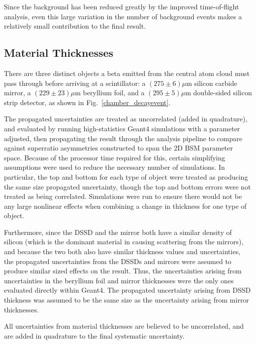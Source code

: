 Since the background has been reduced greatly by the improved time-of-flight
analysis, even this large variation in the number of background events makes a relatively small contribution to the final result.


\subsection{Material Thicknesses}
There are three distinct objects a beta emitted from the central atom cloud must pass through before arriving at a scintillator:  a $(275 \pm 6) \mu$m silicon carbide mirror, a $(229 \pm 23) \mu$m beryllium foil, and a $(295 \pm 5) \mu$m double-sided silicon strip detector, as shown in Fig.~\ref{chamber_decayevent}.~

The propagated uncertainties are treated as uncorrelated (added in quadrature), and evaluated by running high-statistics Geant4 simulations with a parameter adjusted, then propagating the result through the analysis pipeline to compare against superratio asymmetries constructed to span the 2D BSM parameter space.  Because of the processor time required for this, certain simplifying assumptions were used to reduce the necessary number of simulations.  In particular, the top and bottom for each type of object were treated as producing the same size propagated uncertainty, though the top and bottom errors were not treated as being correlated.  Simulations were run to ensure there would not be any large nonlinear effects when combining a change in thickness for one type of object.  

Furthermore, since the DSSD and the mirror both have a similar density of silicon (which is the dominant material in causing scattering from the mirrors), and because the two both also have similar thickness values and uncertainties, the propagated uncertainties from the DSSDs and mirrors were assumed to produce similar sized effects on the result.  Thus, the uncertainties arising from uncertainties in the beryllium foil and mirror thicknesses were the only ones evaluated directly within Geant4.  The propagated uncertainty arising from DSSD thickness was assumed to be the same size as the uncertainty arising from mirror thicknesses.  

All uncertainties from material thicknesses are believed to be uncorrelated, and are added in quadrature to the final systematic uncertainty.  


 

